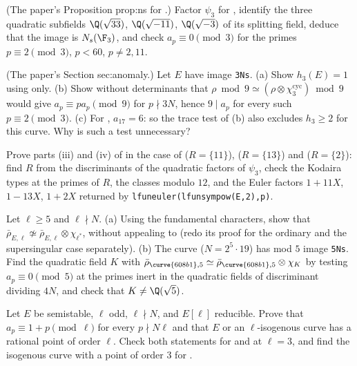\begin{exercise}\label{ex:galrep:726a1}
(The paper's Proposition prop:ns for .) Factor $\psi_3$ for , identify the three quadratic subfields $\Q(\sqrt{33})$, $\Q(\sqrt{-11})$, $\Q(\sqrt{-3})$ of
its splitting field, deduce that the image is $N_s(\F_3)$, and check $a_p\equiv0\pmod3$ for the primes $p\equiv2\pmod3$, $p<60$, $p\ne2,11$.
\end{exercise}

\begin{exercise}\label{ex:galrep:h3-traces}
(The paper's Section sec:anomaly.) Let $E$ have image \texttt{3Ns}. (a) Show $h_3(E)=1$ using  only. (b) Show without determinants that
$\rho\bmod9\simeq(\rho\otimes\chi_3^{\mathrm{cyc}})\bmod9$ would give $a_p\equiv pa_p\pmod9$ for $p\nmid3N$, hence $9\mid a_p$ for every such $p\equiv2\pmod3$. (c) For , $a_{17}=6$: so the trace
test of (b) also excludes $h_3\ge2$ for this curve. Why is such a test unnecessary?
\end{exercise}

\begin{exercise}\label{ex:galrep:R-examples}
Prove parts (iii) and (iv) of  in the case of  ($R=\{11\}$),  ($R=\{13\}$) and  ($R=\{2\}$): find $R$
from the discriminants of the quadratic factors of $\psi_3$, check the Kodaira types at the primes of $R$, the classes modulo $12$, and the Euler
factors $1+11X$, $1-13X$, $1+2X$ returned by \texttt{lfuneuler(lfunsympow(E,2),p)}.
\end{exercise}

\begin{exercise}\label{ex:galrep:lstar}
Let $\ell\ge5$ and $\ell\nmid N$. (a) Using the fundamental characters, show that $\bar\rho_{E,\ell}\not\simeq\bar\rho_{E,\ell}\otimes\chi_{\ell^*}$, without appealing to
 (redo its proof for the ordinary and the supersingular case separately). (b) The curve  ($N=2^5\cdot19$) has mod $5$
image \texttt{5Ns}. Find the quadratic field $K$ with $\bar\rho_{\curve{608b1},5}\simeq\bar\rho_{\curve{608b1},5}\otimes\chi_K$ by testing $a_p\equiv0\pmod5$ at the primes inert in the
quadratic fields of discriminant dividing $4N$, and check that $K\ne\Q(\sqrt5)$.
\end{exercise}

\begin{exercise}\label{ex:galrep:eisenstein}
Let $E$ be semistable, $\ell$ odd, $\ell\nmid N$, and $E[\ell]$ reducible. Prove that $a_p\equiv1+p\pmod\ell$ for every $p\nmid N\ell$ and that $E$ or an $\ell$-isogenous curve has a
rational point of order $\ell$. Check both statements for  and  at $\ell=3$, and find the isogenous curve with a point of order $3$ for .
\end{exercise}

